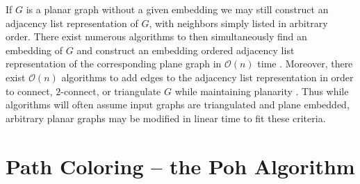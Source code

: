 \documentclass[letterpaper, 12pt]{article}
\theoremstyle{definition}
\theoremstyle{definition}
\theoremstyle{thm}
\theoremstyle{definition}
\begin{document}
If $G$ is a planar graph without a given embedding we may still construct an
adjacency list representation of $G$, with neighbors simply listed in arbitrary
order. There exist numerous algorithms to then simultaneously find an embedding
of $G$ and construct an embedding ordered adjacency list representation of the
corresponding plane graph in $\mathcal{O}(n)$ time \cite{tarjan, lempel, boyer,
booth}. Moreover, there exist $\mathcal{O}(n)$ algorithms to add edges
to the adjacency list representation in order to connect, $2$-connect, or
triangulate $G$ while maintaining planarity \cite{hagerup,reed,eswaran}. Thus
while algorithms will often assume input graphs are triangulated and plane
embedded, arbitrary planar graphs may be modified in linear time to fit these
criteria.

\begin{comment}
If $G$ is a $2$-connected weakly triangulated graph with an outer cycle
$C=v_1v_2\ldots v_k$, vertices listed in clockwise order. We shall set the
the neighbor range of $v_i$ such that the start and indices are the indices of
$v_{i-1}$ and $v_{i+1}$ in $A[v_i]$, respectively. These indices are consider
in a cyclic manner, that is we consider $v_{0}=v_k$, $v_1=v_{k+1}$, and so on.
Many of the algorithms considered will work by removing one vertex at a time,
and considering the remaining graph using the maximal $2$-connected
subgraphs. If $v$ on the outer face, we may remove $v$ from $G$ by contracting
the neighbor ranges for its neighboring vertices on the outer face exclude $v$.
Interior neighbors will be If one of the
neighbors of $v$ is a cutvertex once $G$ is removed, we will split into two
\end{comment}


\section{Path Coloring -- the Poh Algorithm}
\end{document}
